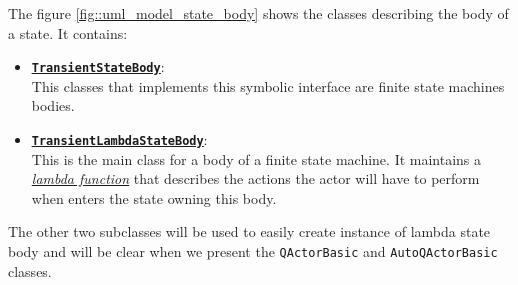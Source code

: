 The figure \ref{fig::uml_model_state_body} shows the classes describing the body of a state. It contains:
\begin{itemize}
	\item 	\href{https://github.com/LM-96/QA-Extensions/blob/main/it.unibo.qakactor/src/main/kotlin/model/actorbody/TransientStateBody.kt}{\underline{\textbf{\texttt{TransientStateBody}}}}:\\
	This classes that implements this symbolic interface are finite state machines bodies.
	
	\item 	\href{https://github.com/LM-96/QA-Extensions/blob/main/it.unibo.qakactor/src/main/kotlin/model/actorbody/TransientLambdaStateBody.kt}{\underline{\textbf{\texttt{TransientLambdaStateBody}}}}:\\
	This is the main class for a body of a finite state machine. It maintains a \href{https://kotlinlang.org/docs/lambdas.html}{\textit{lambda function}} that describes the actions the actor will have to perform when enters the state owning this body.
\end{itemize}
The other two subclasses will be used to easily create instance of lambda state body and will be clear when we present the \texttt{QActorBasic} and \texttt{AutoQActorBasic} classes.




